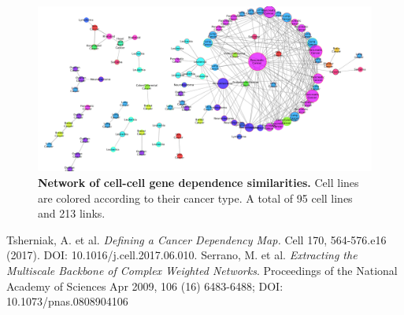 \documentclass[12pt]{article}
\begin{document}
\begin{figure}[h]
\centering
\includegraphics[width=1\columnwidth]{fig1.pdf}
 \caption*{\scriptsize \textbf{Network of cell-cell gene dependence similarities.} Cell lines are colored according to their cancer type. A total of 95 cell lines and 213 links.}
\end{figure}


 
\begin{thebibliography}{99}
\vspace{-2ex}
\scriptsize
{} Tsherniak, A. et al. {\textit{Defining a Cancer Dependency Map.}} Cell 170, 564-576.e16 (2017). DOI: 10.1016/j.cell.2017.06.010.
\vspace{-2ex}
 Serrano, M. et al. {\textit{Extracting the Multiscale Backbone of Complex Weighted Networks}}. Proceedings of the National Academy of Sciences Apr 2009, 106 (16) 6483-6488; DOI: 10.1073/pnas.0808904106

\end{thebibliography}
\end{document}
